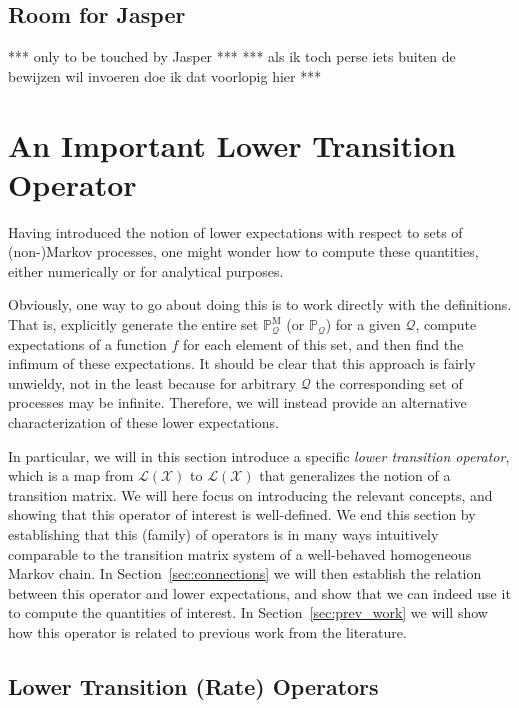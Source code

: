 \documentclass[10pt]{paper}
\theoremstyle{definition}
\newcommand{\states}{\mathcal{X}}
\newcommand{\processes}{\mathbb{P}}
\newcommand{\mprocesses}{\processes^{\mathrm{M}}}
\newcommand{\gambles}{\mathcal{L}}
\newcommand{\gamblesX}{\gambles(\states)}
\newcommand{\rateset}{\mathcal{Q}}
\begin{document}
\subsection{Room for Jasper}

*** only to be touched by Jasper ***
*** als ik toch perse iets buiten de bewijzen wil invoeren doe ik dat voorlopig hier ***

\section{An Important Lower Transition Operator}
\label{sec:lowertrans}

Having introduced the notion of lower expectations with respect to sets of (non-)Markov processes, one might wonder how to compute these quantities, either numerically or for analytical purposes. 

Obviously, one way to go about doing this is to work directly with the definitions. That is, explicitly generate the entire set $\mprocesses_\rateset$ (or $\processes_\rateset$) for a given $\rateset$, compute expectations of a function $f$ for each element of this set, and then find the infimum of these expectations. It should be clear that this approach is fairly unwieldy, not in the least because for arbitrary $\rateset$ the corresponding set of processes may be infinite. Therefore, we will instead provide an alternative characterization of these lower expectations. 

In particular, we will in this section introduce a specific \emph{lower transition operator}, which is a map from $\gamblesX$ to $\gamblesX$ that generalizes the notion of a transition matrix. We will here focus on introducing the relevant concepts, and showing that this operator of interest is well-defined. We end this section by establishing that this (family) of operators is in many ways intuitively comparable to the transition matrix system of a well-behaved homogeneous Markov chain. In Section~\ref{sec:connections} we will then establish the relation between this operator and lower expectations, and show that we can indeed use it to compute the quantities of interest. In Section~\ref{sec:prev_work} we will show how this operator is related to previous work from the literature.

\subsection{Lower Transition (Rate) Operators}
\end{document}
